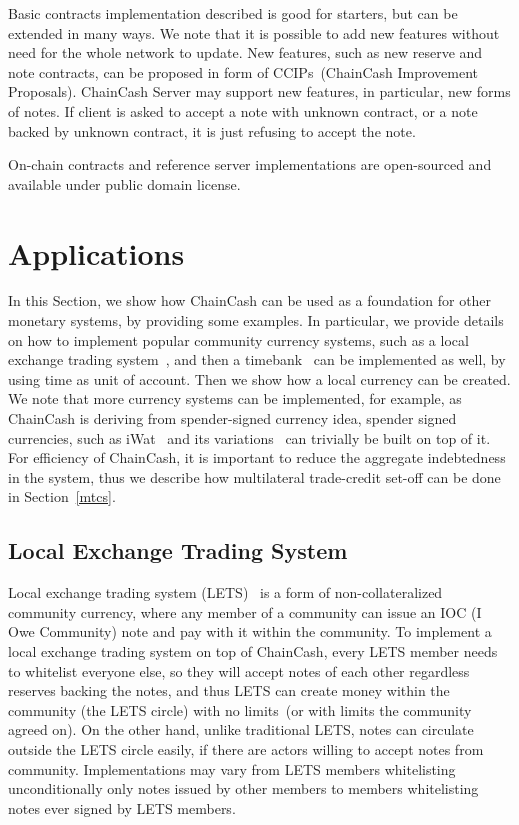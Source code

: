 \documentclass{llncs}   %
\newcommand{\cc}{ChainCash}
\begin{document}

Basic contracts implementation described is good for starters, but can be extended in many ways.  We note that it is possible
to add new features without need for the whole network to update. New features, such as new reserve and note contracts,
can be proposed in form of CCIPs~(ChainCash Improvement Proposals). ChainCash
Server may support new features, in particular, new forms of notes. If client is asked to accept a note with unknown
contract, or a note backed by unknown contract, it is just refusing to accept the note.

On-chain contracts and reference server implementations are open-sourced and available under public domain license.

\section{Applications}
\label{sec-apps}

In this Section, we show how \cc{} can be used as a foundation for other monetary systems, by providing some examples.
In particular, we provide details on how to implement popular community currency systems, such as a local exchange trading
 system~\cite{williams1996new}, and then a timebank~\cite{mcquaid2004review} can be implemented as well, by using time
as unit of account. Then we show how a local currency can be created. We note that more currency systems can be
implemented, for example, as \cc{} is deriving from spender-signed currency idea, spender signed currencies, such as
iWat~\cite{saito2003peer} and its variations~\cite{saito2005wot,saito2005multiplication,saito2006reduction} can
trivially be built on top of it. For efficiency of \cc{}, it is important to reduce the aggregate indebtedness in the system,
thus we describe how multilateral trade-credit set-off can be done in Section~\ref{mtcs}.

\subsection{Local Exchange Trading System}

Local exchange trading system (LETS)~\cite{williams1996new} is a form of non-collateralized community currency, where any member of a community
can issue an IOC (I Owe Community) note and pay with it within the community.
To implement a local exchange trading system on top of \cc{}, every LETS member needs to whitelist everyone else, so
they will accept notes of each other regardless reserves backing the notes, and thus LETS can create money within the community (the LETS circle) with no limits~(or with limits the community agreed on). On the other hand, unlike traditional LETS, notes can circulate outside the LETS circle easily, if there are actors willing to accept notes from community. Implementations may vary from LETS members whitelisting unconditionally only notes issued by other members to members whitelisting notes ever signed by LETS members.
\end{document}
